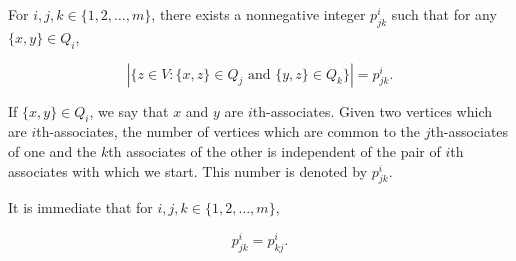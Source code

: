 For $i, j, k \in \{1, 2, \ldots, m\}$, there exists a nonnegative integer $p_{jk}^i$ such that for any $\{x, y\} \in Q_i$,

$$\left| \{z \in V: \{x, z\} \in Q_j \text{ and } \{y, z\} \in Q_k\} \right| = p_{jk}^i.$$

If $\{x, y\} \in Q_i$, we say that $x$ and $y$ are $i$th-associates. Given two vertices which are $i$th-associates, the number of vertices which are common to the $j$th-associates of one and the $k$th associates of the other is independent of the pair of $i$th associates with which we start. This number is denoted by $p_{jk}^i$.

It is immediate that for $i, j, k \in \{1, 2, \ldots, m\}$,

$$p_{jk}^i = p_{kj}^i.$$
